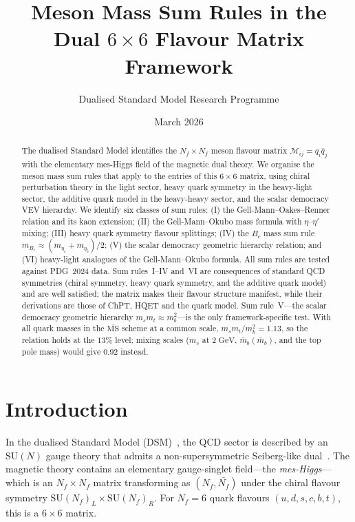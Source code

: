 \documentclass[11pt,a4paper]{article}
\title{\textbf{Meson Mass Sum Rules in the Dual $6 \times 6$ Flavour Matrix Framework}}
\author{Dualised Standard Model Research Programme}
\date{March 2026}
\newcommand{\Nf}{N_{\!f}}
\newcommand{\SU}[1]{\mathrm{SU}(#1)}
\theoremstyle{plain}
\begin{document}
\maketitle

\begin{abstract}
The dualised Standard Model identifies the $\Nf \times \Nf$ meson
flavour matrix $\mathcal{M}_{ij} = q_i \bar{q}_j$ with the elementary
mes-Higgs field of the magnetic dual theory.  We organise the meson
mass sum rules that apply to the entries of this $6 \times 6$ matrix,
using chiral perturbation theory in the light sector, heavy quark
symmetry in the heavy-light sector, the additive quark model in the
heavy-heavy sector, and the scalar democracy VEV hierarchy.  We
identify six classes of sum rules: (I) the
Gell-Mann--Oakes--Renner relation and its kaon extension;
(II) the Gell-Mann--Okubo mass formula with $\eta$--$\eta'$ mixing;
(III) heavy quark symmetry flavour splittings; (IV) the $B_c$ mass
sum rule $m_{B_c} \approx (m_{\eta_c} + m_{\eta_b})/2$; (V) the scalar
democracy geometric hierarchy relation; and (VI) heavy-light analogues
of the Gell-Mann--Okubo formula.  All sum rules are tested against
PDG~2024 data.  Sum rules~I--IV and~VI are consequences of standard QCD
symmetries (chiral symmetry, heavy quark symmetry, and the additive
quark model) and are well satisfied; the matrix makes their flavour
structure manifest, while their derivations are those of ChPT, HQET and
the quark model.  Sum rule~V---the scalar democracy geometric hierarchy
$m_s m_t \approx m_b^2$---is the only framework-specific test.  With all
quark masses in the $\overline{\text{MS}}$ scheme at a common scale,
$m_s m_t/m_b^2 = 1.13$, so the relation holds at the $13\%$ level;
mixing scales ($m_s$ at $2\;\text{GeV}$, $\bar{m}_b(\bar{m}_b)$, and the
top pole mass) would give $0.92$ instead.
\end{abstract}

\tableofcontents
\newpage

\section{Introduction}
\label{sec:intro}

In the dualised Standard Model
(DSM)~\cite{CacciapagliaSannino2024,Sannino2024}, the QCD sector is
described by an $\SU{N}$ gauge theory that admits a non-supersymmetric
Seiberg-like dual~\cite{Seiberg1995}.  The magnetic theory contains an
elementary gauge-singlet field---the \emph{mes-Higgs}---which is an
$\Nf \times \Nf$ matrix transforming as $(\Nf, \bar{\Nf})$ under the
chiral flavour symmetry $\SU{\Nf}_L \times \SU{\Nf}_R$.  For
$\Nf = 6$ quark flavours $(u,d,s,c,b,t)$, this is a $6 \times 6$
matrix.
\end{document}
